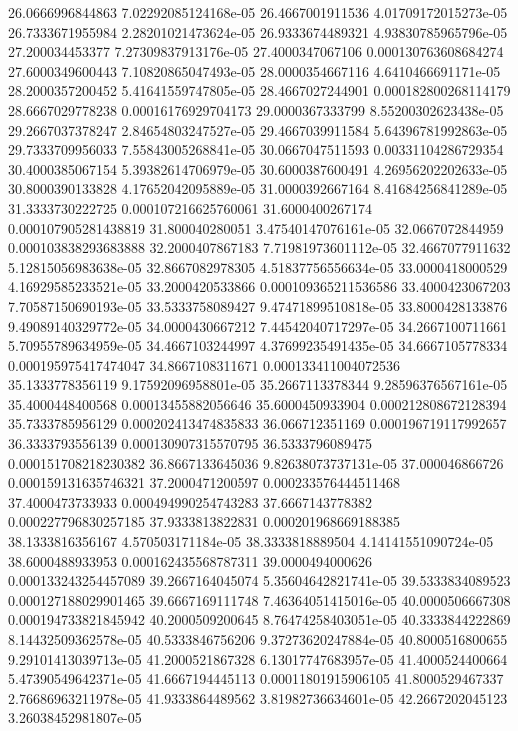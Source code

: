 {26.0666996844863 7.02292085124168e-05
26.4667001911536 4.01709172015273e-05
26.7333671955984 2.28201021473624e-05
26.9333674489321 4.93830785965796e-05
27.200034453377 7.27309837913176e-05
27.4000347067106 0.000130763608684274
27.6000349600443 7.10820865047493e-05
28.0000354667116 4.6410466691171e-05
28.2000357200452 5.41641559747805e-05
28.4667027244901 0.000182800268114179
28.6667029778238 0.00016176929704173
29.0000367333799 8.55200302623438e-05
29.2667037378247 2.84654803247527e-05
29.4667039911584 5.64396781992863e-05
29.7333709956033 7.55843005268841e-05
30.0667047511593 0.00331104286729354
30.4000385067154 5.39382614706979e-05
30.6000387600491 4.26956202202633e-05
30.8000390133828 4.17652042095889e-05
31.0000392667164 8.41684256841289e-05
31.3333730222725 0.000107216625760061
31.6000400267174 0.000107905281438819
31.800040280051 3.47540147076161e-05
32.0667072844959 0.000103838293683888
32.2000407867183 7.71981973601112e-05
32.4667077911632 5.12815056983638e-05
32.8667082978305 4.51837756556634e-05
33.0000418000529 4.16929585233521e-05
33.2000420533866 0.000109365211536586
33.4000423067203 7.70587150690193e-05
33.5333758089427 9.47471899510818e-05
33.8000428133876 9.49089140329772e-05
34.0000430667212 7.44542040717297e-05
34.2667100711661 5.70955789634959e-05
34.4667103244997 4.37699235491435e-05
34.6667105778334 0.000195975417474047
34.8667108311671 0.000133411004072536
35.1333778356119 9.17592096958801e-05
35.2667113378344 9.28596376567161e-05
35.4000448400568 0.00013455882056646
35.6000450933904 0.000212808672128394
35.7333785956129 0.000202413474835833
36.066712351169 0.000196719117992657
36.3333793556139 0.000130907315570795
36.5333796089475 0.000151708218230382
36.8667133645036 9.82638073737131e-05
37.000046866726 0.000159131635746321
37.2000471200597 0.000233576444511468
37.4000473733933 0.000494990254743283
37.6667143778382 0.000227796830257185
37.9333813822831 0.000201968669188385
38.1333816356167 4.570503171184e-05
38.3333818889504 4.14141551090724e-05
38.6000488933953 0.000162435568787311
39.0000494000626 0.000133243254457089
39.2667164045074 5.35604642821741e-05
39.5333834089523 0.000127188029901465
39.6667169111748 7.46364051415016e-05
40.0000506667308 0.000194733821845942
40.2000509200645 8.76474258403051e-05
40.3333844222869 8.14432509362578e-05
40.5333846756206 9.37273620247884e-05
40.8000516800655 9.29101413039713e-05
41.2000521867328 6.13017747683957e-05
41.4000524400664 5.47390549642371e-05
41.6667194445113 0.00011801915906105
41.8000529467337 2.76686963211978e-05
41.9333864489562 3.81982736634601e-05
42.2667202045123 3.26038452981807e-05
}
